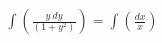 \documentclass[preview]{standalone}
\begin{document}
\begin{align*}
\int \left( \frac{y \  dy}{\left( 1 + {y}^{2} \right)} \right) = \int \left( \frac{dx}{x} \right)
\end{align*}
\end{document}
